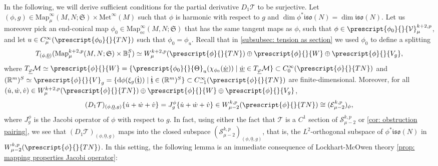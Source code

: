 \documentclass{article}
\numberwithin{equation}{section}        %
\theoremstyle{bfnote}
\theoremstyle{definition}
\theoremstyle{bfremark}
\newcommand{\R}{\mathbb{R}}                 %
\newcommand{\Ball}{\mathbb{B}}              %
\newcommand{\Map}{\mathrm{Map}}             %
\newcommand{\Met}{\mathrm{Met}}             %
\newcommand{\diff}{\mathrm{d}}                      %
\begin{document}
In the following, we will derive sufficient conditions for the partial derivative $D_1\mathcal{T}$ to be surjective. Let $(\phi,g) \in \Map^\infty_\mu(M,N;\mathfrak{S}) \times \Met^{\infty}(M)$ such that $\phi$ is harmonic with respect to $g$ and $\dim \phi^* \mathfrak{iso}(N) = \dim \mathfrak{iso}(N)$. Let us moreover pick an end-conical map $\phi_0 \in \Map^\infty_{\mathrm{ec}}(M,N;\mathfrak{S})$ that has the same tangent maps as $\phi$, such that $\phi \in \prescript{\phi_0}{}{\mathcal{V}}^{k+2,p}_\mu$, and let $u \in C^\infty_\mu(\prescript{\phi_0}{}{TN})$ such that $\phi_0 = \phi_u$. Recall that in \cref{subsubsec: tension as section} we used $\phi_0$ to define a splitting
\begin{equation*}
    T_{(\phi,\underline{0})}(\Map^{k+2,p}_\mu(M,N;\mathfrak{S}) \times \Ball_1^S) \simeq W^{k+2,p}_\mu(\prescript{\phi}{}{TN}) \oplus \prescript{\phi}{}{W} \oplus \prescript{\phi}{}{V_g} ,
\end{equation*}
where $T_{\underline{\varphi}} \mathcal{M} \simeq \prescript{\phi}{}{W} = \{\prescript{\phi_0}{}{\Theta}_u (\chi_{\phi_0}(\dot{\underline{w}})) \mid \dot{\underline{w}} \in T_{\underline{\varphi}} \mathcal{M}\} \subset C^\infty_0(\prescript{\phi}{}{TN})$ and $(\R^m)^S \simeq \prescript{\phi}{}{V}_g = \{ \diff \phi(\xi_g(\dot{\underline{\mathfrak{t}}})) \mid \dot{\underline{\mathfrak{t}}} \in (\R^m)^S\} \subset C^\infty_{-1}(\prescript{\phi}{}{TN})$ are finite-dimensional. Moreover, for all $(\dot u, \dot w, \dot v) \in W^{k+2,p}_\mu(\prescript{\phi}{}{TN}) \oplus \prescript{\phi}{}{W} \oplus \prescript{\phi}{}{V_g}$,
\begin{equation*}
    (D_1 \mathcal{T})_{(\phi,\underline{0},g)}\{\dot u+ \dot w +\dot v\} = J^\phi_g \{\dot u+ \dot w +\dot v\}  \in W^{k,p}_{\mu-2}(\prescript{\phi}{}{TN}) \cong (\mathcal{E}^{k,p}_{\mu-2})_{\phi},
\end{equation*}
where $J^\phi_g$ is the Jacobi operator of $\phi$ with respect to $g$. In fact, using either the fact that $\mathcal{T}$ is a $C^1$ section of $\mathcal{S}^{k,p}_{\mu-2}$ or \cref{cor: obstruction pairing}, we see that $(D_1 \mathcal{T})_{(\phi,\underline{0},g)}$ maps into the closed subspace $(\mathcal{S}^{k,p}_{\mu-2})_{(\phi,\underline{0},g)}$, that is, the $L^2$-orthogonal subspace of $\phi^*\mathfrak{iso}(N)$ in $W^{k,p}_{\mu-2}(\prescript{\phi}{}{TN})$. In this setting, the following lemma is an immediate consequence of Lockhart-McOwen theory \cref{prop: mapping properties Jacobi operator}:
\end{document}

